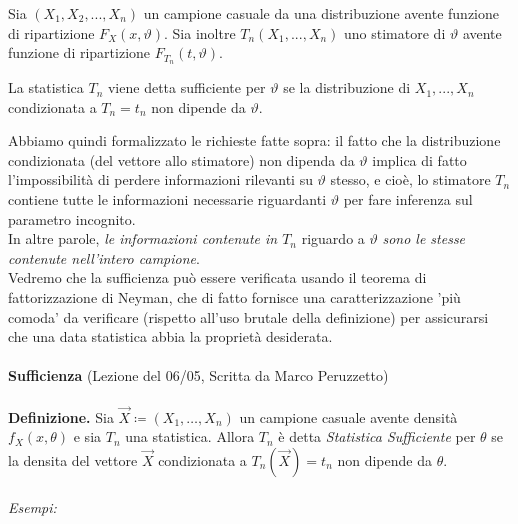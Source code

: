 Sia $(X_1,X_2,...,X_n)$ un campione casuale da una distribuzione avente funzione di ripartizione $F_X(x,\vartheta)$. Sia inoltre $T_n(X_1,...,X_n)$ uno stimatore di $\vartheta$ avente funzione di ripartizione $F_{T_n}(t, \vartheta)$.\\

\begin{definizione}
La statistica $T_n$ viene detta sufficiente per $\vartheta$ se la distribuzione di $X_1,...,X_n$ condizionata a $T_n = t_n$ non dipende da $\vartheta$.
\end{definizione}

Abbiamo quindi formalizzato le richieste fatte sopra: il fatto che la distribuzione condizionata (del vettore allo stimatore) non dipenda da $\vartheta$ implica di fatto l'impossibilità di perdere informazioni rilevanti su $\vartheta$ stesso, e cioè, lo stimatore $T_n$ contiene tutte le informazioni necessarie riguardanti $\vartheta$ per fare inferenza sul parametro incognito.\\
In altre parole, \textit{le informazioni contenute in $T_n$} riguardo a $\vartheta$ \textit{sono le stesse contenute nell'intero campione}.\\
Vedremo che la sufficienza può essere verificata usando il teorema di fattorizzazione di Neyman, che di fatto fornisce una caratterizzazione 'più comoda' da verificare (rispetto all'uso brutale della definizione) per assicurarsi che una data statistica abbia la proprietà desiderata.\\
\\
\noindent\textbf{Sufficienza} (Lezione del 06/05, Scritta da Marco Peruzzetto)\\
\\
\textbf{Definizione.} Sia $\vec{X}\coloneqq (X_1,\ldots,X_n)$ un campione casuale avente densità $f_X(x,\theta)$ e sia $T_n$ una statistica. Allora $T_n$ è detta \textit{Statistica Sufficiente} per $\theta$ se la densita del vettore $\vec{X}$ condizionata a $T_n(\vec{X})=t_n$ non dipende da $\theta.$
\\
\\
\textit{Esempi:} 


